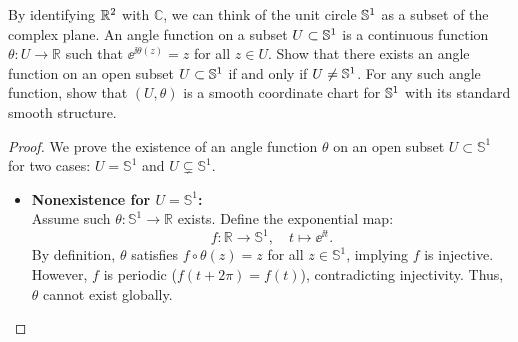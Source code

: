 \begin{problem}
  By identifying $\mathbb{R}^2$ with $\mathbb{C}$, we can think of the unit circle $\mathbb{S}^1$ as a subset of the complex plane. An angle function on a subset $U \subset \mathbb{S}^1$ is a continuous function $\theta \colon U \to \mathbb{R}$ such that  $\ee^{\ii \theta(z)} = z$ for all $z \in U$. Show that there exists an angle function on an open subset $U \subset \mathbb{S}^1$ if and only if $U \neq \mathbb{S}^1$. For any such angle function, show that $(U, \theta)$ is a smooth coordinate chart for $\mathbb{S}^1$ with its standard smooth structure.
  \begin{proof}
    We prove the existence of an angle function $\theta$ on an open subset $U \subset \mathbb{S}^1$ for two cases: $U = \mathbb{S}^1$ and $U \subsetneq \mathbb{S}^1$.
    \begin{itemize}
        \item \textbf{Nonexistence for $U = \mathbb{S}^1$:} \\
        Assume such $\theta \colon \mathbb{S}^1 \to \mathbb{R}$ exists. Define the exponential map:
        $$
        f \colon \mathbb{R} \to \mathbb{S}^1, \quad t \mapsto \ee^{\ii t}.
        $$
        By definition, $\theta$ satisfies $f \circ \theta(z) = z$ for all $z \in \mathbb{S}^1$, implying $f$ is injective. However, $f$ is periodic ($f(t+2\pi)=f(t)$), contradicting injectivity. Thus, $\theta$ cannot exist globally.


\end{itemize}
\end{proof}
\end{problem}
